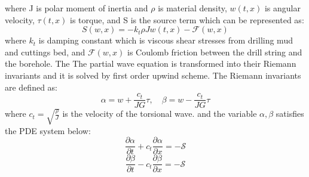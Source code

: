 where J is polar moment of inertia and $\rho$ is material density, $w(t,x)$ is angular velocity, $\tau(t,x)$ is torque, and S is the source term which can be represented as:
\begin{equation}\label{AS-sourceterm}
  S(w,x) = -k_t \rho J w(t,x) - \mathcal{F}(w,x)
\end{equation}
where $k_t$ is damping constant which is viscous shear stresses from drilling mud and cuttings bed, and $\mathcal{F}(w,x)$ is Coulomb friction between the drill string and the borehole. 
The 
The partial wave equation is transformed into their Riemann invariants and it is solved by first order upwind scheme. The Riemann invariants are defined as:
\begin{equation}\label{AS-Riemann}
  \alpha = w + \frac{c_t}{JG}\tau, \quad \beta=w-\frac{c_t}{JG}\tau
\end{equation}
where $c_t = \sqrt{\frac{\rho}{J}}$ is the velocity of the torsional wave. and the variable $\alpha, \beta$ satisfies the PDE system below:
\begin{equation}\label{AS-Riemann_alpha}
  \frac{\partial \alpha}{\partial t} + c_t\frac{\partial \alpha}{\partial x} = -\mathcal{S}
\end{equation}
\begin{equation}\label{AS-Riemann_beta}
  \frac{\partial \beta}{\partial t} - c_t\frac{\partial \beta}{\partial x} = -\mathcal{S}
\end{equation}

